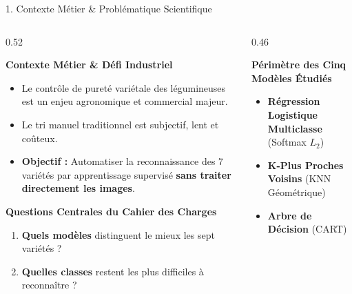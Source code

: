 \documentclass[aspectratio=169,10pt]{beamer}
\begin{document}
\begin{frame}{1. Contexte Métier \& Problématique Scientifique}
    \begin{columns}[T]
        \begin{column}{0.52\textwidth}
            \begin{block}{\textbf{Contexte Métier \& Défi Industriel}}
                \small
                \begin{itemize}
                    \item Le contrôle de pureté variétale des légumineuses est un enjeu agronomique et commercial majeur.
                    \item Le tri manuel traditionnel est subjectif, lent et coûteux.
                    \item \textbf{Objectif :} Automatiser la reconnaissance des 7 variétés par apprentissage supervisé \textbf{sans traiter directement les images}.
                \end{itemize}
            \end{block}
            \vspace{0.15cm}
            \begin{alertblock}{\textbf{Questions Centrales du Cahier des Charges}}
                \small
                \begin{enumerate}
                    \item \textbf{Quels modèles} distinguent le mieux les sept variétés ?
                    \item \textbf{Quelles classes} restent les plus difficiles à reconnaître ?
                \end{enumerate}
            \end{alertblock}
        \end{column}
        \begin{column}{0.46\textwidth}
            \begin{block}{\textbf{Périmètre des Cinq Modèles Étudiés}}
                \centering
                \small
                \begin{itemize}
                    \item \textbf{Régression Logistique Multiclasse} (Softmax $L_2$)
                    \item \textbf{K-Plus Proches Voisins} (KNN Géométrique)
                    \item \textbf{Arbre de Décision} (CART)

\end{itemize}
\end{block}
\end{column}
\end{columns}
\end{frame}
\end{document}
